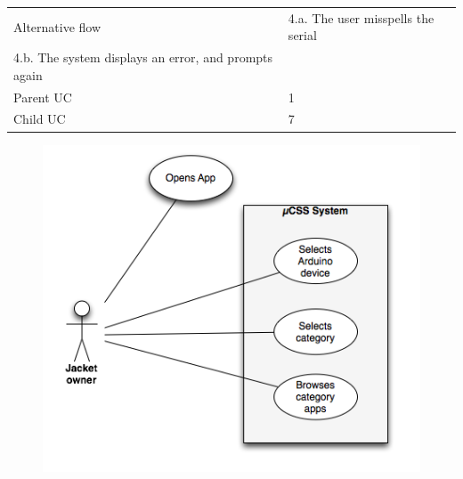 \begin{table}
\begin{tabular}{|l|l|}
        Alternative flow & 4.a. The user misspells the serial \\ 4.b. The system displays an error, and prompts again                                                                                                                                                    \\ 
        Parent UC        & 1                                                                                                                                                                                                                                             \\ 
        Child UC         & 7                                                                                                                                                                                                                                             \\
        \hline
    \end{tabular}
\end{table}

\begin{figure}[H]
\centering
\includegraphics[scale=1]{images/UseCase4}
\end{figure}

